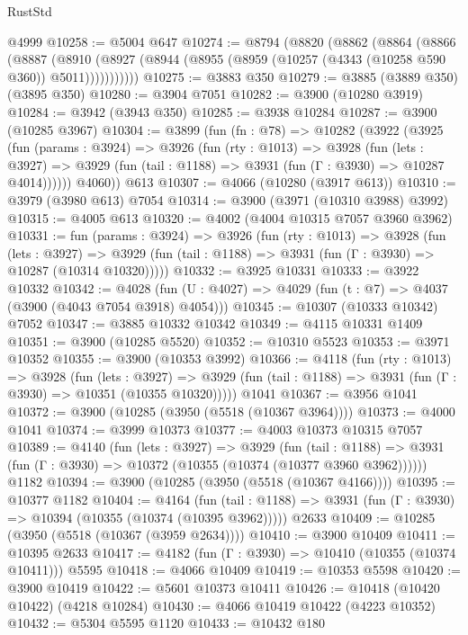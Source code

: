 \begin{lexlean}{RustStd}
\begin{coremodule}
    @4999
@10258 := @5004 @647
@10274 := @8794
    (@8820
      (@8862
        (@8864
          (@8866
            (@8887
              (@8910 (@8927 (@8944 (@8955 (@8959 (@10257 (@4343 (@10258 @590 @360)) @5011)))))))))))
@10275 := @3883 @350
@10279 := @3885 (@3889 @350) (@3895 @350)
@10280 := @3904 @7051
@10282 := @3900 (@10280 @3919)
@10284 := @3942 (@3943 @350)
@10285 := @3938 @10284
@10287 := @3900 (@10285 @3967)
@10304 := @3899
    (fun (fn : @78) =>
    @10282
      (@3922
        (@3925
          (fun (params : @3924) =>
          @3926
            (fun (rty : @1013) =>
            @3928
              (fun (lets : @3927) =>
              @3929 (fun (tail : @1188) => @3931 (fun (Γ : @3930) => @10287 @4014))))))
        @4060))
    @613
@10307 := @4066 (@10280 (@3917 @613))
@10310 := @3979 (@3980 @613) @7054
@10314 := @3900 (@3971 (@10310 @3988) @3992)
@10315 := @4005 @613
@10320 := @4002 (@4004 @10315 @7057 @3960 @3962)
@10331 := fun (params : @3924) =>
  @3926
    (fun (rty : @1013) =>
    @3928
      (fun (lets : @3927) =>
      @3929 (fun (tail : @1188) => @3931 (fun (Γ : @3930) => @10287 (@10314 @10320)))))
@10332 := @3925 @10331
@10333 := @3922 @10332
@10342 := @4028 (fun (U : @4027) => @4029 (fun (t : @7) => @4037 (@3900 (@4043 @7054 @3918) @4054)))
@10345 := @10307 (@10333 @10342) @7052
@10347 := @3885 @10332 @10342
@10349 := @4115 @10331 @1409
@10351 := @3900 (@10285 @5520)
@10352 := @10310 @5523
@10353 := @3971 @10352
@10355 := @3900 (@10353 @3992)
@10366 := @4118
    (fun (rty : @1013) =>
    @3928
      (fun (lets : @3927) =>
      @3929 (fun (tail : @1188) => @3931 (fun (Γ : @3930) => @10351 (@10355 @10320)))))
    @1041
@10367 := @3956 @1041
@10372 := @3900 (@10285 (@3950 (@5518 (@10367 @3964))))
@10373 := @4000 @1041
@10374 := @3999 @10373
@10377 := @4003 @10373 @10315 @7057
@10389 := @4140
    (fun (lets : @3927) =>
    @3929
      (fun (tail : @1188) =>
      @3931 (fun (Γ : @3930) => @10372 (@10355 (@10374 (@10377 @3960 @3962))))))
    @1182
@10394 := @3900 (@10285 (@3950 (@5518 (@10367 @4166))))
@10395 := @10377 @1182
@10404 := @4164
    (fun (tail : @1188) => @3931 (fun (Γ : @3930) => @10394 (@10355 (@10374 (@10395 @3962)))))
    @2633
@10409 := @10285 (@3950 (@5518 (@10367 (@3959 @2634))))
@10410 := @3900 @10409
@10411 := @10395 @2633
@10417 := @4182 (fun (Γ : @3930) => @10410 (@10355 (@10374 @10411))) @5595
@10418 := @4066 @10409
@10419 := @10353 @5598
@10420 := @3900 @10419
@10422 := @5601 @10373 @10411
@10426 := @10418 (@10420 @10422) (@4218 @10284)
@10430 := @4066 @10419 @10422 (@4223 @10352)
@10432 := @5304 @5595 @1120
@10433 := @10432 @180

\end{coremodule}
\end{lexlean}

